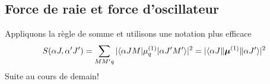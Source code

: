 \subsection{Force de raie et force d'oscillateur}
Appliquons la règle de somme et utilisons une notation plus efficace
\begin{equation}
S(\alpha J, \alpha' J' ) = \sum_{MM'q} \vert \langle \alpha JM \vert \mu^{(1)}_q  \vert \alpha J' M' \rangle \vert^2= 
\vert \langle \alpha J \Vert 
\mbox{\boldmath $ \mu $}^{(1)} \Vert \alpha J' \rangle \vert^2
\end{equation}
Suite au cours de demain!

